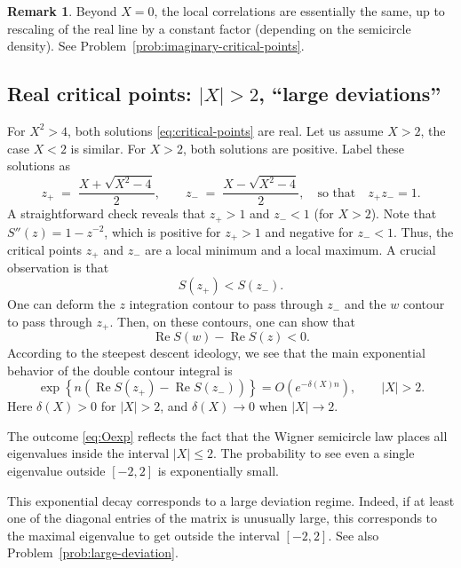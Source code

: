 \documentclass[letterpaper,11pt,oneside,reqno]{article}
\numberwithin{equation}{section}
\theoremstyle{definition}
\newtheorem{remark}[proposition]{Remark}
\begin{document}
\begin{remark}
	Beyond $X=0$, the local correlations are essentially the same,
	up to rescaling of the real line by a constant factor (depending
	on the semicircle density).
	See Problem~\ref{prob:imaginary-critical-points}.
\end{remark}

\subsection{Real critical points: $|X|>2$, ``large deviations''}
\label{sub:real-critical-points}

For \(X^2>4\), both solutions
\eqref{eq:critical-points}
are real. Let us assume $X>2$, the case \(X<2\) is similar.
For $X>2$, both solutions are positive.
Label these solutions as
\[
	z_+ \;=\;\frac{X + \sqrt{X^2-4}}{2},
	\qquad
	z_- \;=\;\frac{X - \sqrt{X^2-4}}{2},
	\quad
	\text{so that}\quad z_+z_-=1.
\]
A straightforward check reveals that \(z_+\!>\!1\) and \(z_-\!<\!1\) (for \(X>2\)).
Note that $S''(z)=1-z^{-2}$, which is positive for \(z_+>1\) and negative for \(z_-<1\).  Thus, the critical points \(z_+\) and \(z_-\) are a local minimum and a local maximum.
A crucial observation is that
\begin{equation*}
	S(z_+)<S(z_-).
\end{equation*}
One can deform the $z$ integration contour to pass through
$z_-$ and the $w$ contour to pass through $z_+$.
Then, on these contours, one can show that
\begin{equation*}
	\operatorname{Re}S(w)-\operatorname{Re}S(z)<0.
\end{equation*}
According to the steepest descent ideology,
we see that the main exponential behavior of the double contour integral is
\begin{equation}
	\label{eq:Oexp}
	\exp\left\{ n\left(
		\operatorname{Re}S(z_+)-\operatorname{Re}S(z_-)
\right) \right\}=O( e^{-\delta(X)n} ), \qquad |X|>2.
\end{equation}
Here $\delta(X)>0$ for $|X|>2$, and $\delta(X)\to0$ when $|X|\to2$.

The outcome \eqref{eq:Oexp} reflects the fact that the
Wigner semicircle law places all eigenvalues inside the
interval \(\lvert X\rvert \le 2\).
The probability to see even a single eigenvalue outside $[-2,2]$
is exponentially small.

This exponential decay corresponds to a large deviation regime.
Indeed, if at least one of the diagonal entries of the matrix
is unusually large, this corresponds to 
the maximal eigenvalue to get outside the interval \([-2,2]\).
See also Problem~\ref{prob:large-deviation}.
\end{document}
